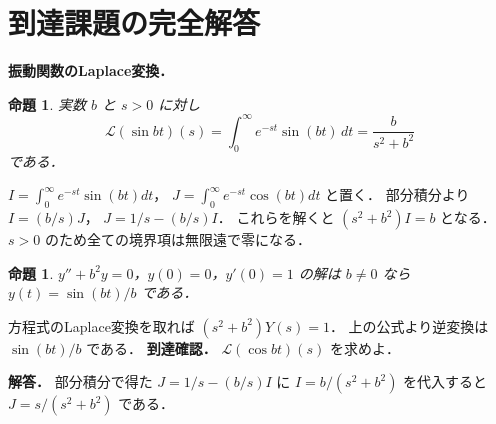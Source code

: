 \documentclass[a5paper,10pt,onecolumn]{jsarticle}
\makeatletter
\theoremstyle{mathnotetheorem}
\newtheorem{proposition}[theorem]{命題}
\renewcommand{\proofname}{証明}
\renewenvironment{proof}[1][\proofname]{%
  \par\pushQED{\qed}\normalfont\topsep4\p@\@plus2\p@\relax
  \trivlist\item[\hskip\labelsep\bfseries #1]\ignorespaces
}{\popQED\endtrivlist\@endpefalse}
\makeatother
\begin{document}
\section{到達課題の完全解答}
\noindent\textbf{振動関数のLaplace変換．}
\begin{proposition}
実数 $b$ と $s>0$ に対し
\[
\mathcal L(\sin bt)(s)
=\int_0^\infty e^{-st}\sin(bt)\,dt
=\frac{b}{s^2+b^2}
\]
である．
\end{proposition}
\begin{proof}
$I=\int_0^\infty e^{-st}\sin(bt)dt$，
$J=\int_0^\infty e^{-st}\cos(bt)dt$ と置く．
部分積分より
$I=(b/s)J$，
$J=1/s-(b/s)I$．
これらを解くと
$(s^2+b^2)I=b$ となる．
$s>0$ のため全ての境界項は無限遠で零になる．
\end{proof}
\begin{proposition}
$y''+b^2y=0$，$y(0)=0$，$y'(0)=1$
の解は $b\ne0$ なら
$y(t)=\sin(bt)/b$ である．
\end{proposition}
\begin{proof}
方程式のLaplace変換を取れば
$(s^2+b^2)Y(s)=1$．
上の公式より逆変換は $\sin(bt)/b$ である．
\end{proof}
\noindent\textbf{到達確認．}
$\mathcal L(\cos bt)(s)$ を求めよ．
\par\noindent\textbf{解答．}
部分積分で得た $J=1/s-(b/s)I$ に
$I=b/(s^2+b^2)$ を代入すると
$J=s/(s^2+b^2)$ である．
\end{document}
